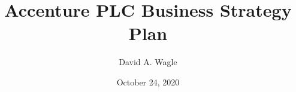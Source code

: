 
\usepackage[utf8]{inputenc}
\usepackage{pgfpages}

\usepackage{palatino}



\title{Accenture PLC Business Strategy Plan}
\author{David A. Wagle}
\date{October 24, 2020}
